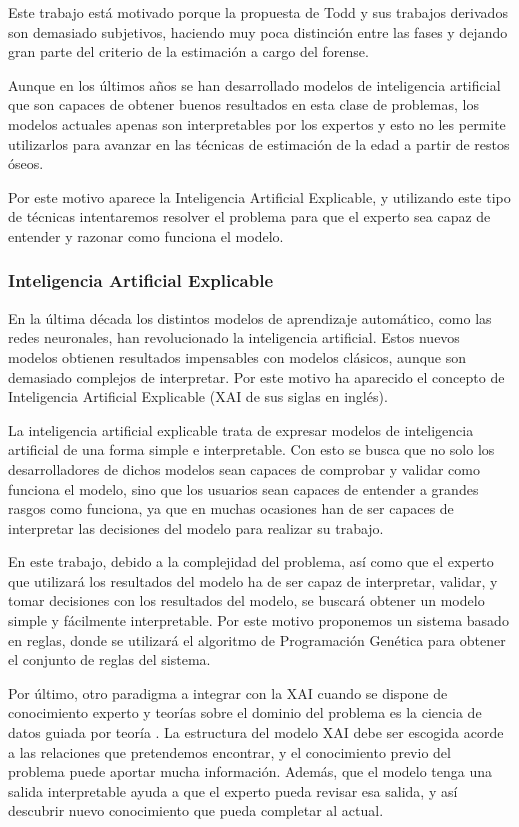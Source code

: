 Este trabajo está motivado porque la propuesta de Todd y sus trabajos derivados son demasiado subjetivos, haciendo muy poca distinción entre las fases y dejando gran parte del criterio de la estimación a cargo del forense.

Aunque en los últimos años se han desarrollado modelos de inteligencia artificial que son capaces de obtener buenos resultados en esta clase de problemas, los modelos actuales apenas son interpretables por los expertos y esto no les permite utilizarlos para avanzar en las técnicas de estimación de la edad a partir de restos óseos.

Por este motivo aparece la Inteligencia Artificial Explicable, y utilizando este tipo de técnicas intentaremos resolver el problema para que el experto sea capaz de entender y razonar como funciona el modelo.


\subsubsection{Inteligencia Artificial Explicable}

En la última década los distintos modelos de aprendizaje automático, como las redes neuronales, han revolucionado la inteligencia artificial. Estos nuevos modelos obtienen resultados impensables con modelos clásicos, aunque son demasiado complejos de interpretar. Por este motivo ha aparecido el concepto de Inteligencia Artificial Explicable \cite{XAI} (XAI de sus siglas en inglés).

La inteligencia artificial explicable trata de expresar modelos de inteligencia artificial de una forma simple e interpretable. Con esto se busca que no solo los desarrolladores de dichos modelos sean capaces de comprobar y validar como funciona el modelo, sino que los usuarios sean capaces de entender a grandes rasgos como funciona, ya que en muchas ocasiones han de ser capaces de interpretar las decisiones del modelo para realizar su trabajo.

En este trabajo, debido a la complejidad del problema, así como que el experto que utilizará los resultados del modelo ha de ser capaz de interpretar, validar, y tomar decisiones con los resultados del modelo, se buscará obtener un modelo simple y fácilmente interpretable. Por este motivo proponemos un sistema basado en reglas, donde se utilizará el algoritmo de Programación Genética para obtener el conjunto de reglas del sistema.

Por último, otro paradigma a integrar con la XAI cuando se dispone de conocimiento experto y teorías sobre el dominio del problema es la ciencia de datos guiada por teoría \cite{theoryGuidedDataScience}. La estructura del modelo XAI debe ser escogida acorde a las relaciones que pretendemos encontrar, y el conocimiento previo del problema puede aportar mucha información. Además, que el modelo tenga una salida interpretable ayuda a que el experto pueda revisar esa salida, y así descubrir nuevo conocimiento que pueda completar al actual.

